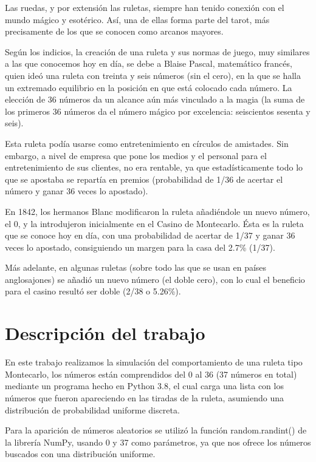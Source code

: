 Las ruedas, y por extensión las ruletas, siempre han tenido conexión con el mundo mágico y esotérico. Así, una de ellas forma parte del tarot, más precisamente de los que se conocen como arcanos mayores.

Según los indicios, la creación de una ruleta y sus normas de juego, muy similares a las que conocemos hoy en día, se debe a Blaise Pascal, matemático francés, quien ideó una ruleta con treinta y seis números (sin el cero), en la que se halla un extremado equilibrio en la posición en que está colocado cada número. La elección de 36 números da un alcance aún más vinculado a la magia (la suma de los primeros 36 números da el número mágico por excelencia: seiscientos sesenta y seis).

Esta ruleta podía usarse como entretenimiento en círculos de amistades. Sin embargo, a nivel de empresa que pone los medios y el personal para el entretenimiento de sus clientes, no era rentable, ya que estadísticamente todo lo que se apostaba se repartía en premios (probabilidad de 1/36 de acertar el número y ganar 36 veces lo apostado).

En 1842, los hermanos Blanc modificaron la ruleta añadiéndole un nuevo número, el 0, y la introdujeron inicialmente en el Casino de Montecarlo. Ésta es la ruleta que se conoce hoy en día, con una probabilidad de acertar de 1/37 y ganar 36 veces lo apostado, consiguiendo un margen para la casa del 2.7\% (1/37).

Más adelante, en algunas ruletas (sobre todo las que se usan en países anglosajones) se añadió un nuevo número (el doble cero), con lo cual el beneficio para el casino resultó ser doble (2/38 o 5.26\%).

\section{Descripción del trabajo}
\label{sec:headings}
En este trabajo realizamos la simulación del comportamiento de una ruleta tipo Montecarlo, los números están comprendidos del 0 al 36 (37 números en total) mediante un programa hecho en Python 3.8, el cual carga una lista con los números que fueron apareciendo en las tiradas de la ruleta, asumiendo una distribución de probabilidad uniforme discreta.

Para la aparición de números aleatorios se utilizó la función random.randint() de la librería NumPy, usando 0 y 37 como parámetros, ya que nos ofrece los números buscados con una distribución uniforme.

